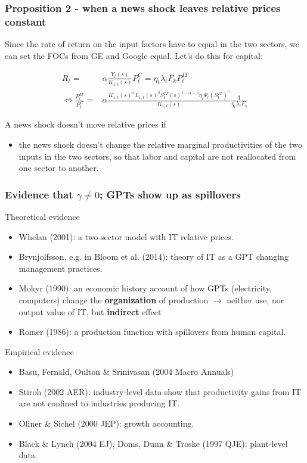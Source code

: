 \documentclass{beamer}
\begin{document}
\begin{frame}
\frametitle{Proposition 2 - when a news shock leaves relative prices constant}

Since the rate of return on the input factors have to equal in the two sectors, we can set the FOCs from GE and Google equal. Let's do this for capital:

\begin{align*}
R_t = & \alpha \frac{Y_t(s)}{K_{1,t}(s)} P^C_t = \eta_t \lambda_t F_k P^{IT}_t \\
\Leftrightarrow \frac{P^{IT}_t }{P^{C}_t } = & \alpha \frac{K_{1,t}(s)^{\alpha}L_{1,t}(s)^{\beta}S^{IT}_t(s)^{1-\alpha - \beta}\eta_t \Psi_t (S^{IT}_t)^{\gamma} }{K_{1,t}(s)} \frac{1}{\eta_t \lambda_t F_k}
\end{align*}


A news shock doesn't move relative prices if 
\begin{itemize}
\item the news shock doesn't change the relative marginal productivities of the two inputs in the two sectors, so that labor and capital are not reallocated from one sector to another.
\end{itemize}

\end{frame}

\begin{frame}
\frametitle{Evidence that $\gamma \neq 0$; GPTs show up as spillovers}

Theoretical evidence
\begin{itemize}
\item Whelan (2001): a two-sector model with IT relative prices.
\item Brynjolfsson, e.g. in Bloom et al. (2014): theory of IT as a GPT changing management practices.
\item Mokyr (1990):  an economic history account of how GPTs (electricity, computers) change the \textbf{organization} of production $\rightarrow$ neither use, nor output value of IT, but \textbf{indirect} effect
\item Romer (1986): a production function with spillovers from human capital.
\end{itemize}

Empirical evidence
\begin{itemize}
\item Basu, Fernald, Oulton \& Srinivasan (2004 Macro Annuals)
\item Stiroh (2002 AER): industry-level data show that productivity gains from IT are not confined to industries producing IT.
\item Oliner \& Sichel (2000 JEP): growth accounting.
\item Black \& Lynch (2004 EJ), Doms, Dunn \& Troske (1997 QJE): plant-level data.
\end{itemize}

\end{frame}
\end{document}
